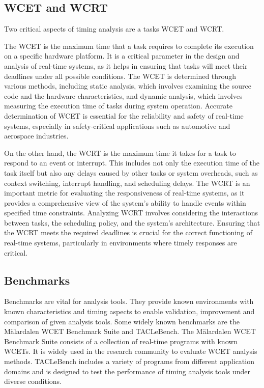 \subsection{\ac{WCET} and \ac{WCRT}}\label{subsec:wcet_wcrt}
Two critical aspects of timing analysis are a tasks \ac{WCET} and \ac{WCRT}.

The \ac{WCET} is the maximum time that a task requires to complete its execution on a specific hardware platform.
It is a critical parameter in the design and analysis of real-time systems, as it helps in ensuring that tasks will meet their deadlines under all possible conditions.
The \ac{WCET} is determined through various methods, including static analysis, which involves examining the source code and the hardware characteristics, and dynamic analysis, which involves measuring the execution time of tasks during system operation\cite{wilhelmWorstcaseExecutiontimeProblem2008}.
Accurate determination of \ac{WCET} is essential for the reliability and safety of real-time systems, especially in safety-critical applications such as automotive and aerospace industries\cite{kirnerWCETAnalysisTool2012}.

On the other hand, the \ac{WCRT} is the maximum time it takes for a task to respond to an event or interrupt.
This includes not only the execution time of the task itself but also any delays caused by other tasks or system overheads, such as context switching, interrupt handling, and scheduling delays\cite{buttazzoHardRealTimeComputing2024}.
The \ac{WCRT} is an important metric for evaluating the responsiveness of real-time systems, as it provides a comprehensive view of the system's ability to handle events within specified time constraints.
Analyzing \ac{WCRT} involves considering the interactions between tasks, the scheduling policy, and the system's architecture\cite{davisSurveyHardRealtime2011}.
Ensuring that the \ac{WCRT} meets the required deadlines is crucial for the correct functioning of real-time systems, particularly in environments where timely responses are critical.

\subsection{Benchmarks}\label{subsec:benchmarks}
Benchmarks are vital for analysis tools.
They provide known environments with known characteristics and timing aspects to enable validation, improvement and comparison of given analysis tools.
Some widely known benchmarks are the Mälardalen WCET Benchmark Suite and TACLeBench. 
The Mälardalen WCET Benchmark Suite consists of a collection of real-time programs with known WCETs. It is widely used in the research community to evaluate WCET analysis methods\cite{gustafssonMalardalenWCETBenchmarks2012}. 
TACLeBench includes a variety of programs from different application domains and is designed to test the performance of timing analysis tools under diverse conditions\cite{falkTACLeBenchBenchmarkCollection2016}.

